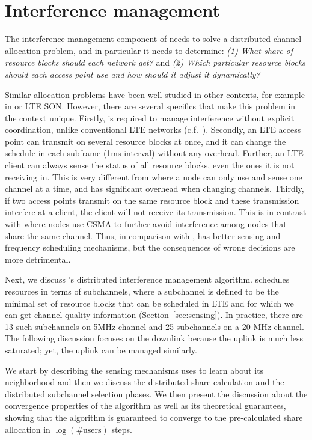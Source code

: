 
\section{Interference management}

The interference management component of \cf needs to solve a distributed channel allocation problem, 
and in particular it needs to determine: {\em (1) What share of resource blocks should each network get?} and 
{\em (2) Which particular resource blocks should each access point use and how should it adjust it dynamically?}

Similar allocation problems have been well studied in other contexts, for example in \wf or LTE SON. 
However, there are several specifics that make this problem in the \cf context unique. 
Firstly, \cf is required to manage interference without explicit coordination, unlike conventional LTE networks (c.f.~\cite{smallcellbook, fermi}). 
Secondly, an LTE access point can transmit on several resource blocks at once, 
and it can change the schedule in each subframe (1ms interval) without any overhead. 
Further, an LTE client can always sense the status of all resource blocks, even the ones it is not receiving in. 
This is very different from \wf where a node can only use and sense one channel at a time, and has significant overhead when changing channels. 
Thirdly, if two access points transmit on the same resource block and these transmission interfere at a client, the client will not receive its transmission. This is in contrast with \wf where nodes use CSMA to further avoid interference among nodes that share the same channel. 
Thus, in comparison with \wf, \cf has better sensing and frequency scheduling mechanisms, but the consequences of wrong decisions are more detrimental. 

Next, we discuss \cf's distributed interference management algorithm. 
\cf schedules resources in terms of subchannels, where a subchannel is defined to be the minimal set of resource blocks that can be scheduled in LTE and for which we can get channel quality information (Section~\ref{sec:sensing}). 
In practice, there are 13 such subchannels on 5MHz channel and 25 subchannels on a 20 MHz channel. 
The following discussion focuses on the downlink because the uplink is much less saturated; 
yet, the uplink can be managed similarly.

We start by describing the sensing mechanisms \cf uses to learn about its neighborhood and then we discuss the distributed share calculation and the distributed subchannel selection phases. %
We then present the discussion about the convergence properties of the algorithm as well as its theoretical guarantees, showing that 
the algorithm is guaranteed to converge to the pre-calculated share allocation in $\log{(\mbox{\# users})}$ steps. 



